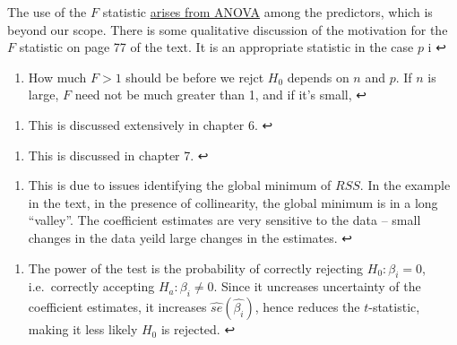 \documentclass[11pt]{article}
\providecommand{\tightlist}{%
      \setlength{\itemsep}{0pt}\setlength{\parskip}{0pt}}
\begin{document}
The use of the \(F\) statistic
\href{https://en.wikipedia.org/wiki/F-test\#Formula_and_calculation}{arises
from ANOVA} among the predictors, which is beyond our scope. There is
some qualitative discussion of the motivation for the \(F\) statistic on
page 77 of the text. It is an appropriate statistic in the case \(p\) i
↩

\hypertarget{foot18}{}
\begin{enumerate}
\def\labelenumi{\arabic{enumi}.}
\setcounter{enumi}{17}
\tightlist
\item
  How much \(F > 1\) should be before we rejct \(H_0\) depends on \(n\)
  and \(p\). If \(n\) is large, \(F\) need not be much greater than 1,
  and if it's small, ↩
\end{enumerate}

\hypertarget{foot19}{}
\begin{enumerate}
\def\labelenumi{\arabic{enumi}.}
\setcounter{enumi}{18}
\tightlist
\item
  This is discussed extensively in chapter 6. ↩
\end{enumerate}

\hypertarget{foot20}{}
\begin{enumerate}
\def\labelenumi{\arabic{enumi}.}
\setcounter{enumi}{19}
\tightlist
\item
  This is discussed in chapter 7. ↩
\end{enumerate}

\hypertarget{foot21}{}
\begin{enumerate}
\def\labelenumi{\arabic{enumi}.}
\setcounter{enumi}{20}
\tightlist
\item
  This is due to issues identifying the global minimum of \(RSS\). In
  the example in the text, in the presence of collinearity, the global
  minimum is in a long ``valley''. The coefficient estimates are very
  sensitive to the data -- small changes in the data yeild large changes
  in the estimates. ↩
\end{enumerate}

\hypertarget{foot22}{}
\begin{enumerate}
\def\labelenumi{\arabic{enumi}.}
\setcounter{enumi}{21}
\tightlist
\item
  The power of the test is the probability of correctly rejecting
  \(H_0: \beta_i = 0\), i.e.~correctly accepting
  \(H_a: \beta_i \neq 0\). Since it uncreases uncertainty of the
  coefficient estimates, it increases \(\hat{se}(\hat{\beta_i})\), hence
  reduces the \(t\)-statistic, making it less likely \(H_0\) is
  rejected. ↩
\end{enumerate}
\end{document}
